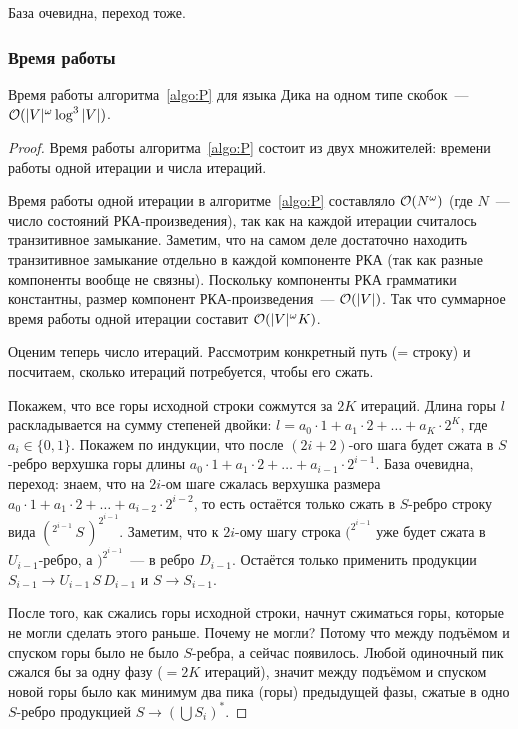 База очевидна, переход тоже.

\subsubsection{Время работы}

\begin{theorem}
  Время работы алгоритма~\ref{algo:P} для языка Дика на одном типе скобок~--- $\mathcal{O}(|V|^{\omega} \log^3 |V|)$.
\end{theorem}

\begin{proof}
  Время работы алгоритма~\ref{algo:P} состоит из двух множителей: времени работы одной итерации и числа итераций.

  Время работы одной итерации в алгоритме~\ref{algo:P} составляло $\mathcal{O}(N^{\omega})$ (где $N$~--- число состояний РКА-произведения), так как на каждой итерации считалось транзитивное замыкание. Заметим, что на самом деле достаточно находить транзитивное замыкание отдельно в каждой компоненте РКА (так как разные компоненты вообще не связны). Поскольку компоненты РКА грамматики константны, размер компонент РКА-произведения~--- $\mathcal{O}(|V|)$. Так что суммарное время работы одной итерации составит $\mathcal{O}(|V|^{\omega} K)$.

  Оценим теперь число итераций. Рассмотрим конкретный путь (= строку) и посчитаем, сколько итераций потребуется, чтобы его сжать.

  Покажем, что все горы исходной строки сожмутся за $2K$ итераций. Длина горы $l$ раскладывается на сумму степеней двойки: $l = a_0 \cdot 1 + a_1 \cdot 2 + \dots + a_K \cdot 2^{K}$, где $a_i \in \{0, 1\}$. Покажем по индукции, что после $(2i+2)$-ого шага будет сжата в $S$-ребро верхушка горы длины $a_0 \cdot 1 + a_1 \cdot 2 + \dots + a_{i-1} \cdot 2^{i-1}$. База очевидна, переход: знаем, что на $2i$-ом шаге сжалась верхушка размера $a_0 \cdot 1 + a_1 \cdot 2 + \dots + a_{i-2} \cdot 2^{i-2}$, то есть остаётся только сжать в $S$-ребро строку вида $(^{2^{i-1}} \, S \, )^{2^{i-1}}$. Заметим, что к $2i$-ому шагу строка $(^{2^{i-1}}$ уже будет сжата в $U_{i-1}$-ребро, а $)^{2^{i-1}}$~--- в ребро $D_{i-1}$. Остаётся только применить продукции $S_{i-1} \to U_{i-1} \, S \, D_{i-1}$ и $S \to S_{i-1}$.


  После того, как сжались горы исходной строки, начнут сжиматься горы, которые не могли сделать этого раньше. Почему не могли? Потому что между подъёмом и спуском горы было не было $S$-ребра, а сейчас появилось. Любой одиночный пик сжался бы за одну фазу ($= 2K$ итераций), значит между подъёмом и спуском новой горы было как минимум два пика (горы) предыдущей фазы, сжатые в одно $S$-ребро продукцией $S \to (\bigcup S_i)^{*}$. 


\end{proof}
